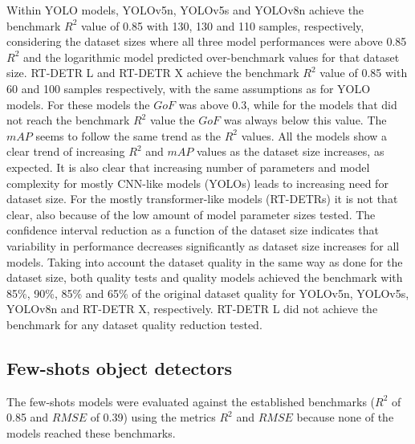 \documentclass[journal,article,submit,pdftex,moreauthors]{Definitions/mdpi}
\begin{document}
Within YOLO models, YOLOv5n, YOLOv5s and YOLOv8n achieve the benchmark $R^2$ 
value of 0.85 with 130, 130 and 110 samples, respectively, considering the dataset
sizes where all three model performances were above 0.85 $R^2$ and the logarithmic
model predicted over-benchmark values for that dataset size.
RT-DETR L and RT-DETR X achieve the benchmark $R^2$ value of 0.85 with 60 and 100 samples
respectively, with the same assumptions as for YOLO models.
For these models the $GoF$ was above 0.3, while for the models that did
not reach the benchmark $R^2$ value the $GoF$ was always below this value.
The $mAP$ seems to follow the same trend as the $R^2$ values.
All the models show a clear trend of increasing $R^2$ and $mAP$
values as the dataset size increases, as expected.
It is also clear that increasing number of parameters and model complexity for
mostly CNN-like models (YOLOs) leads to increasing need for dataset size.
For the mostly transformer-like models (RT-DETRs) it is not that clear, also because of
the low amount of model parameter sizes tested.
The confidence interval reduction as a function of the dataset size indicates that 
variability in performance decreases significantly as dataset size increases for 
all models.
Taking into account the dataset quality in the same way as done for the dataset size,
both quality tests and quality models achieved the benchmark with 85\%, 90\%, 85\% and
65\% of the original dataset quality for YOLOv5n, YOLOv5s, YOLOv8n and RT-DETR X, respectively.
RT-DETR L did not achieve the benchmark for any dataset quality reduction tested.

\subsection{Few-shots object detectors}

The few-shots models were evaluated against the established benchmarks ($R^2$ of 0.85 and $RMSE$ of 0.39) 
using the metrics $R^2$ and $RMSE$ because none of the models reached these benchmarks.
\end{document}
